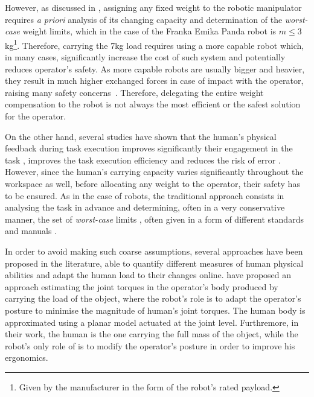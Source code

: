 However, as discussed in , assigning any fixed weight to the robotic manipulator requires \textit{a priori} analysis of its changing capacity and determination of the \textit{worst-case} weight limits, which in the case of the Franka Emika Panda robot is $m\leq3$kg\footnote{Given by the manufacturer in the form of the robot's rated payload.}. Therefore, carrying the 7kg load requires using a more capable robot which, in many cases, significantly increase the cost of such system and potentially reduces operator's safety. As more capable robots are usually bigger and heavier, they result in much higher exchanged forces in case of impact with the operator, raising many safety concerns~\cite{smu}.
Therefore, delegating the entire weight compensation to the robot is not always the most efficient or the safest solution for the operator. 

On the other hand, several studies have shown that the human's physical feedback during task execution improves significantly their engagement in the task \cite{rani2007operator}, improves the task execution efficiency and reduces the risk of error \cite{BYRNE1996249}. However, since the human's carrying capacity varies significantly throughout the workspace as well, before allocating any weight to the operator, their safety has to be ensured. As in the case of robots, the traditional approach consists in analysing the task in advance and determining, often in a very conservative manner, the set of \textit{worst-case} limits \cite{shoaf1997comprehensive}, often given in a form of different standards \cite{nasa} and manuals \cite{health1992manual}. 

In order to avoid making such coarse assumptions, several approaches have been proposed in the literature, able to quantify different measures of human physical abilities and adapt the human load to their changes online. \citet{Kim2018} have proposed an approach estimating the joint torques in the operator's body produced by carrying the load of the object, where the robot's role is to adapt the operator's posture to minimise the magnitude of human's joint torques. The human body is approximated using a planar model actuated at the joint level. Furthremore, in their work, the human is the one carrying the full mass of the object, while the robot's only role of is to modify the operator's posture in order to improve his ergonomics. 

